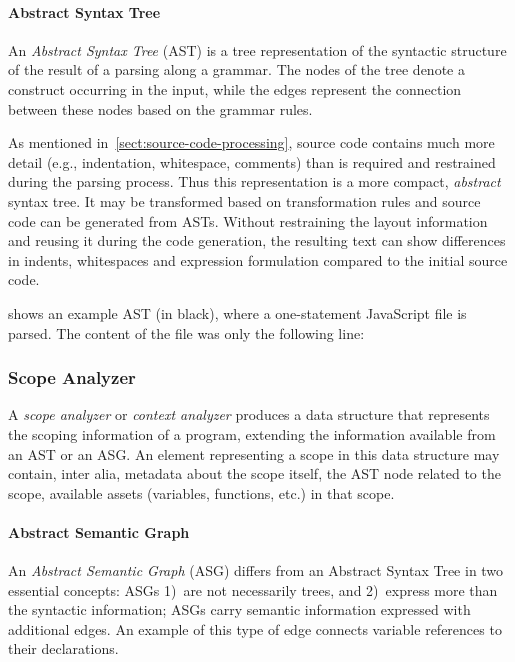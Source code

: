 \paragraph{Abstract Syntax Tree}
An \emph{Abstract Syntax Tree} (AST) is a tree representation of the syntactic structure of the result of a parsing along a grammar. The nodes of the tree denote a construct occurring in the input, while the edges represent the connection between these nodes based on the grammar rules.

As mentioned in~\cref{sect:source-code-processing}, source code contains much more detail (e.g., indentation, whitespace, comments) than is required and restrained during the parsing process. Thus this representation is a more compact, \emph{abstract} syntax tree. It may be transformed based on transformation rules and source code can be generated from ASTs. Without restraining the layout information and reusing it during the code generation, the resulting text can show differences in indents, whitespaces and expression formulation compared to the initial source code.

 shows an example AST (in black), where a one-statement JavaScript file is parsed. The content of the file was only the following line:



\subsubsection{Scope Analyzer}
A \emph{scope analyzer} or \emph{context analyzer} produces a data structure that represents the scoping information of a program, extending the information available from an AST or an ASG. An element representing a scope in this data structure may contain, inter alia, metadata about the scope itself, the AST node related to the scope, available assets (variables, functions, etc.) in that scope.~\cite{shift-scope}

\paragraph{Abstract Semantic Graph}
An \emph{Abstract Semantic Graph} (ASG) differs from an Abstract Syntax Tree in two essential concepts: ASGs 1)~are not necessarily trees, and 2)~express more than the syntactic information; ASGs carry semantic information expressed with additional edges. An example of this type of edge connects variable references to their declarations.~\cite{raghavan_dex:_2004}

